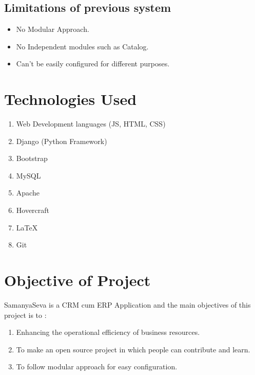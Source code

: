  \subsection{Limitations of previous system }
\begin{itemize}
\item No Modular Approach. 

\item No Independent modules such as Catalog.

\item Can't be easily configured for different purposes.


\end{itemize}
\section{Technologies Used}
\begin{enumerate}
\item Web Development languages (JS, HTML, CSS)
\item Django (Python Framework)
\item Bootstrap
\item MySQL
\item Apache
\item Hovercraft
\item LaTeX
\item Git

\end{enumerate}

\section{Objective of Project}
SamanyaSeva is a CRM cum ERP Application and the 
main objectives of this project is to :
\begin{enumerate}
\item Enhancing the operational efficiency of business resources. 
\item To make an open source project in which people can contribute and learn.
\item To follow modular approach for easy configuration.
\end{enumerate}


\newpage


